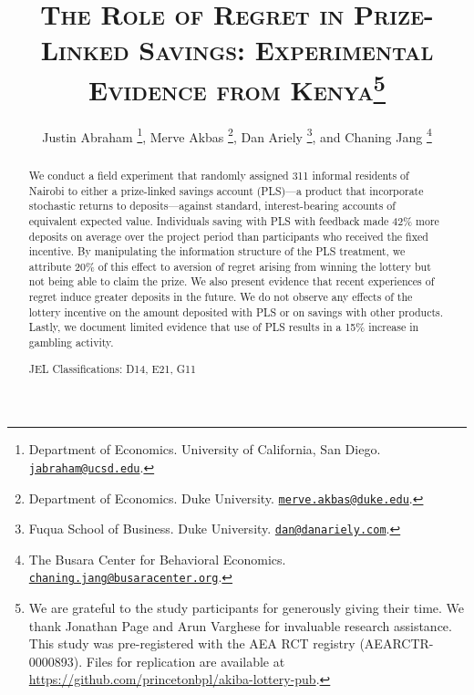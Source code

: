 \documentclass[11pt]{article}
\begin{document}
\title{\textsc{The Role of Regret in Prize-Linked Savings: Experimental Evidence from Kenya}\protect\footnote{We are grateful to the study participants for generously giving their time. We thank Jonathan Page and Arun Varghese for invaluable research assistance. This study was pre-registered with the AEA RCT registry (AEARCTR-0000893). Files for replication are available at \url{https://github.com/princetonbpl/akiba-lottery-pub}.}}

\author{
	Justin Abraham
		\thanks{Department of Economics. University of California, San Diego. \protect\href{mailto:jabraham@ucsd.edu}{\nolinkurl{jabraham@ucsd.edu}}.},
	Merve Akbas
		\thanks{Department of Economics. Duke University. \protect\href{mailto:merve.akbas@duke.edu}{\nolinkurl{merve.akbas@duke.edu}}.},
	Dan Ariely
		\thanks{Fuqua School of Business. Duke University. \protect\href{mailto:dan@danariely.com}{\nolinkurl{dan@danariely.com}}.}, and
	Chaning Jang
		\thanks{The Busara Center for Behavioral Economics. \protect\href{mailto:chaning.jang@busaracenter.org}{\nolinkurl{chaning.jang@busaracenter.org}}.}
}

\maketitle

	\begin{abstract}

		We conduct a field experiment that randomly assigned 311 informal residents of Nairobi to either a prize-linked savings account (PLS)---a product that incorporate stochastic returns to deposits---against standard, interest-bearing accounts of equivalent expected value. Individuals saving with PLS with feedback made 42\% more deposits on average over the project period than participants who received the fixed incentive. By manipulating the information structure of the PLS treatment, we attribute 20\% of this effect to aversion of regret arising from winning the lottery but not being able to claim the prize. We also present evidence that recent experiences of regret induce greater deposits in the future. We do not observe any effects of the lottery incentive on the amount deposited with PLS or on savings with other products. Lastly, we document limited evidence that use of PLS results in a 15\% increase in gambling activity.

		\medskip \noindent
		JEL Classifications: D14, E21, G11

 	\end{abstract}
\end{document}

